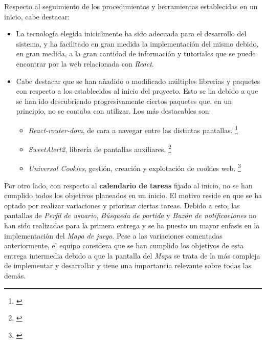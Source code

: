 \documentclass[11pt, a4paper, titlepage]{article}
\begin{document}
Respecto al seguimiento de los procedimientos y herramientas establecidas en un inicio, cabe destacar:

\begin{itemize}
    \item La tecnología elegida inicialmente ha sido adecuada para el desarrollo del sistema, y ha facilitado en gran medida la implementación del mismo debido, en gran medida, a la gran cantidad de información y tutoriales que se puede encontrar por la web relacionada con \textit{React}.

    \item Cabe destacar que se han añadido o modificado múltiples librerias y paquetes con respecto a los establecidos al inicio del proyecto. Esto se ha debido a que se han ido descubriendo progresivamente ciertos paquetes que, en un principio, no se contaba con utilizar. Los más destacables son:
        \begin{itemize}
            \item \textit{React-router-dom}, de cara a navegar entre las distintas pantallas. \footnote{\href{https://v5.reactrouter.com/web/guides/quick-start}{}}
            \item \textit{SweetAlert2}, librería de pantallas auxiliares.
            \footnote{\href{https://sweetalert2.github.io}{}}
            \item \textit{Universal Cookies}, gestión, creación y explotación de cookies web.
            \footnote{\href{https://www.npmjs.com/package/universal-cookie}{}}
        \end{itemize}
\end{itemize}

Por otro lado, con respecto al \textbf{calendario de tareas} fijado al inicio, no se han cumplido todos los objetivos planeados en un inicio. El motivo reside  en que se ha optado por realizar variaciones y priorizar ciertas tareas.
Debido a esto, las pantallas de \textit{Perfil de usuario}, \textit{Búsqueda de partida} y \textit{Buzón de notificaciones} no han sido realizadas para la primera entrega y se ha puesto un mayor enfasis en la implementación del \textit{Mapa de juego}. 
Pese a las variaciones comentadas anteriormente, el equipo considera que se han cumplido los objetivos de esta entrega intermedia debido a que la pantalla del \textit{Mapa} se trata de la más compleja de implementar y desarrollar y tiene una importancia relevante sobre todas las demás. \\
\end{document}

